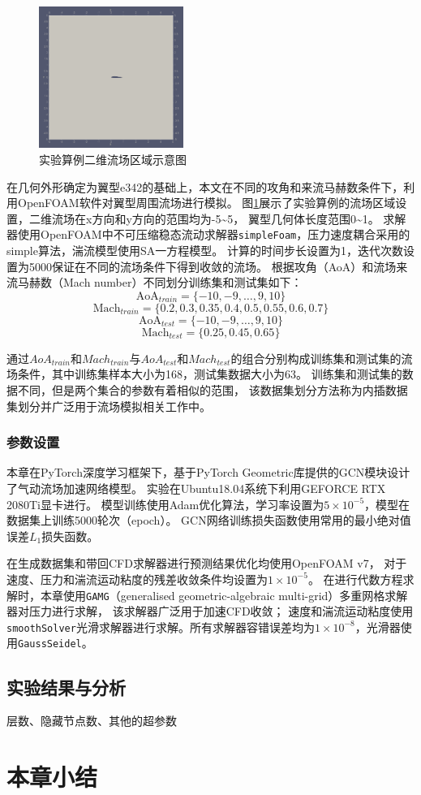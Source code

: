 \begin{figure}[htp]
	\centering
	\includegraphics[width=0.42\textwidth]{figures/flowfield.png}
	\caption{实验算例二维流场区域示意图}
	\label{fig:field}
\end{figure}

在几何外形确定为翼型e342的基础上，本文在不同的攻角和来流马赫数条件下，利用OpenFOAM软件对翼型周围流场进行模拟。
图\ref{fig:field}展示了实验算例的流场区域设置，二维流场在x方向和y方向的范围均为-5\textasciitilde5，
翼型几何体长度范围0\textasciitilde1。
求解器使用OpenFOAM中不可压缩稳态流动求解器\texttt{simpleFoam}，压力速度耦合采用的simple算法，湍流模型使用SA一方程模型。
计算的时间步长设置为1，迭代次数设置为5000保证在不同的流场条件下得到收敛的流场。
根据攻角（AoA）和流场来流马赫数（Mach  number）不同划分训练集和测试集如下：
$$\text {AoA}_{train} =\{-10,-9, \ldots, 9,10\}$$
$$\text {Mach}_{train} =\{0.2, 0.3, 0.35, 0.4, 0.5, 0.55, 0.6, 0.7\}$$
$$\text {AoA}_{test} =\{-10,-9, \ldots, 9,10\}$$
$$\text {Mach}_{test} =\{0.25, 0.45, 0.65\}$$

通过${AoA}_{train}$和${Mach}_{train}$与${AoA}_{test}$和${Mach}_{test}$的组合分别构成训练集和测试集的流场条件，其中训练集样本大小为168，测试集数据大小为63。
训练集和测试集的数据不同，但是两个集合的参数有着相似的范围，
该数据集划分方法称为内插数据集划分并广泛用于流场模拟相关工作中\cite{bhatnagar2019prediction,DBLP:conf/kdd/GuoLI16}。

\subsubsection{参数设置}
本章在PyTorch深度学习框架下，基于PyTorch Geometric库提供的GCN模块设计了气动流场加速网络模型。
实验在Ubuntu18.04系统下利用GEFORCE RTX 2080Ti显卡进行。
模型训练使用Adam优化算法，学习率设置为$5\times10^{-5}$，模型在数据集上训练5000轮次（epoch）。
GCN网络训练损失函数使用常用的最小绝对值误差$L_1$损失函数。

在生成数据集和带回CFD求解器进行预测结果优化均使用OpenFOAM v7，
对于速度、压力和湍流运动粘度的残差收敛条件均设置为$1\times10^{-5}$。
在进行代数方程求解时，本章使用\texttt{GAMG}（generalised geometric-algebraic multi-grid）多重网格求解器对压力进行求解，
该求解器广泛用于加速CFD收敛；
速度和湍流运动粘度使用\texttt{smoothSolver}光滑求解器进行求解。所有求解器容错误差均为$1\times10^{-8}$，光滑器使用\texttt{GaussSeidel}。


\subsection{实验结果与分析}

层数、隐藏节点数、其他的超参数

\section{本章小结}

